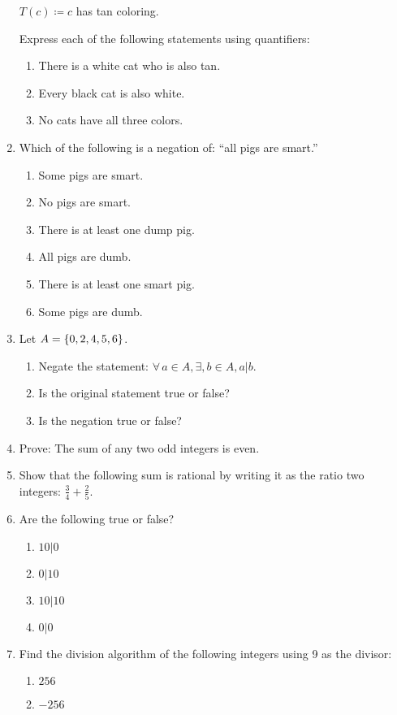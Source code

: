 \documentclass[letterpaper,12pt,fleqn]{article}
\begin{document}
\begin{enumerate}[left=0in]
  \(T(c)\coloneqq c\) has tan coloring.

  Express each of the following statements using quantifiers:
  \begin{enumerate}
  \item There is a white cat who is also tan.
  \item Every black cat is also white.
  \item No cats have all three colors.
  \end{enumerate}

\item Which of the following is a negation of: ``all pigs are smart.''
  \begin{enumerate}
  \item Some pigs are smart.
  \item No pigs are smart.
  \item There is at least one dump pig.
  \item All pigs are dumb.
  \item There is at least one smart pig.
  \item Some pigs are dumb.
  \end{enumerate}

\item Let \(A=\{0,2,4,5,6\}\).
  \begin{enumerate}
  \item Negate the statement: \(\forall\,a\in A,\exists,b\in A,a|b\).
  \item Is the original statement true or false?
  \item Is the negation true or false?
  \end{enumerate}

\item Prove: The sum of any two odd integers is even.

\item Show that the following sum is rational by writing it as the ratio two integers: \(\frac{3}{4}+\frac{2}{5}\).

\item Are the following true or false?
  \begin{enumerate}
  \item \(10|0\)
  \item \(0|10\)
  \item \(10|10\)
  \item \(0|0\)
  \end{enumerate}

\item Find the division algorithm of the following integers using 9 as the divisor:
  \begin{enumerate}
  \item \(256\)
  \item \(-256\)
  \end{enumerate}


\end{enumerate}
\end{document}
